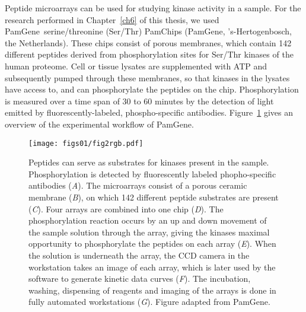 Peptide microarrays can be used for studying kinase activity in a sample. For the research performed in Chapter~\ref{ch6} of this thesis, we used PamGene\textregistered~serine/threonine (Ser/Thr) PamChips (PamGene, 's-Hertogenbosch, the Netherlands). These chips consist of porous membranes, which contain 142 different peptides derived from phosphorylation sites for Ser/Thr kinases of the human proteome. Cell or tissue lysates are supplemented with ATP and subsequently pumped through these membranes, so that kinases in the lysates have access to, and can phosphorylate the peptides on the chip. Phosphorylation is measured over a time span of 30 to 60 minutes by the detection of light emitted by fluorescently\hyp{}labeled, phospho\hyp{}specific antibodies. Figure~\ref{fig1.2} gives an overview of the experimental workflow of PamGene.
%
\begin{figure}[htbp]
  \centering
  \begin{minipage}[b]{0.50\linewidth}
   \texttt{[image: figs01/fig2rgb.pdf]}	%
  \end{minipage}
    \hfill
  \begin{minipage}[b]{0.46\linewidth}
    \caption{Peptides can serve as substrates for kinases present in the sample. Phosphorylation is detected by fluorescently labeled phopho\hyp{}specific antibodies ({\it A}). The microarrays consist of a porous ceramic membrane ({\it B}), on which 142 different peptide substrates are present ({\it C}). Four arrays are combined into one chip ({\it D}). The phosphorylation reaction occurs by an up and down movement of the sample solution through the array, giving the kinases maximal opportunity to phosphorylate the peptides on each array ({\it E}). When the solution is underneath the array, the CCD camera in the workstation takes an image of each array, which is later used by the software to generate kinetic data curves ({\it F}). The incubation, washing, dispensing of reagents and imaging of the arrays is done in fully automated workstations ({\it G}). Figure adapted from PamGene\textregistered.}
     \label{fig1.2}
     \end{minipage}
\end{figure}
%

